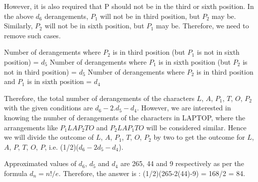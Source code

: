 \documentclass[a4paper]{article}
\begin{document}
\begin{enumerate}
However, it is also required that P should not be in the third or sixth position. In the above $d_6$ derangements, $P_1$ will not be in third position, but $P_2$ may be. Similarly, $P_2$ will not be in sixth position, but $P_1$ may be. Therefore, we need to remove such cases.

Number of derangements where $P_2$ is in third position (but $P_1$ is not in sixth position) = $d_5$
Number of derangements where $P_1$ is in sixth position (but $P_2$ is not in third position) = $d_5$
Number of derangements where $P_2$ is in third position and $P_1$ is in sixth position = $d_4$

Therefore, the total number of derangements of the characters $L$, $A$, $P_1$, $T$, $O$, $P_2$ with the given conditions are $d_6 - 2.d_5 - d_4$.
However, we are interested in knowing the number of derangements of the characters in LAPTOP, where the arrangements like $P_1 L A P_2 T O$ and $P_2 L A P_1 T O$ will be considered similar. Hence we will divide the outcome of $L$, $A$, $P_1$, $T$, $O$, $P_2$ by two to get the outcome for $L$, $A$, $P$, $T$, $O$, $P$, i.e. (1/2)($d_6 - 2d_5 - d_4$).    

Approximated values of $d_6$, $d_5$ and $d_4$ are 265, 44 and 9 respectively as per the formula $d_n = n!/e$. Therefore, the answer is : (1/2)(265-2(44)-9) = 168/2 = 84.
    
    


\end{enumerate}
\end{document}
